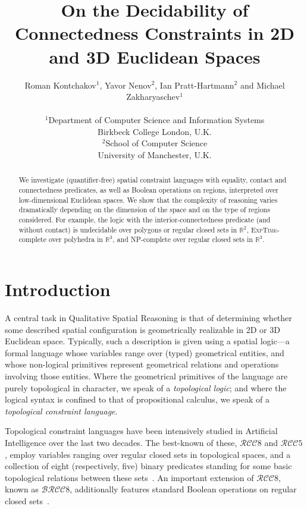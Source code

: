 \documentclass{article}
\title{On the Decidability of Connectedness Constraints in 2D and 3D Euclidean Spaces}
\author{Roman Kontchakov$^1$\!, Yavor Nenov$^2$\!, Ian Pratt-Hartmann$^2$ and Michael Zakharyaschev$^1$\\
{\parbox[t]{60mm}{\centering $^1$Department of Computer Science and Information Systems\\ Birkbeck College London, U.K.}}\hspace*{3em}
\parbox[t]{60mm}{\centering $^2$School of Computer Science\\ University of Manchester, U.K.}}
\newcommand{\NP}{\textsc{NP}}
\newcommand{\ExpTime}{\textsc{ExpTime}}
\newcommand{\RCCE}{\ensuremath{\mathcal{RCC}8}}\newcommand{\RCCF}{\ensuremath{\mathcal{RCC}5}}\newcommand{\BRCCE}{\ensuremath{\mathcal{BRCC}8}}\newcommand{\RCCEc}{\ensuremath{\RCCE{}c}}\newcommand{\RCCEci}{\ensuremath{\RCCE{}c^\circ}}\newcommand{\cBCc}{\ensuremath{\mathcal{C}c}}\newcommand{\cBCci}{\ensuremath{\mathcal{C}c^\circ}}
\newcommand{\R}{\mathbb{R}}
\begin{document}
\maketitle

\begin{abstract}
We investigate (quantifier-free) spatial constraint languages with
equality, contact and connectedness predicates, as well as Boolean
operations on regions, interpreted over low-dimensional Euclidean
spaces. We show that the complexity of reasoning varies dramatically
depending on the dimension of the space and on the type of regions
considered. For example, the logic with the interior-connectedness
predicate (and without contact) is undecidable over polygons or
regular closed sets in $\R^2$, \ExpTime-complete over polyhedra in
$\R^3$, and \NP-complete over regular closed sets in $\R^3$.
\end{abstract}




\section{Introduction}\label{sec:intro}

A central task in Qualitative Spatial Reasoning is that of determining
whether some described spatial configuration is geometrically
realizable in 2D or 3D Euclidean space. Typically, such a description
is given using a spatial logic---a formal language whose variables
range over (typed) geometrical entities, and whose non-logical
primitives represent geometrical relations and operations involving
those entities. Where the geometrical primitives of the language are
purely topological in character, we speak of a \emph{topological
  logic}; and where the logical syntax is confined to that of
propositional calculus, we speak of a \emph{topological constraint
  language}.

Topological constraint languages have been intensively studied in
Artificial Intelligence over the last two decades.  The best-known of
these, \RCCE{} and \RCCF, employ variables ranging over regular closed
sets in topological spaces, and a collection of eight (respectively,
five) binary predicates standing for some basic topological relations
between these
sets~\cite{ijcai:Egenhofer&Franzosa91,ijcai:Randelletal92,ijcai:Bennett94,ijcai:Renz&Nebel98}. An
important extension of \RCCE, known as \BRCCE{}, additionally features
standard Boolean operations on regular closed
sets~\cite{ijcai:Wolter&Z00ecai}.
\end{document}
